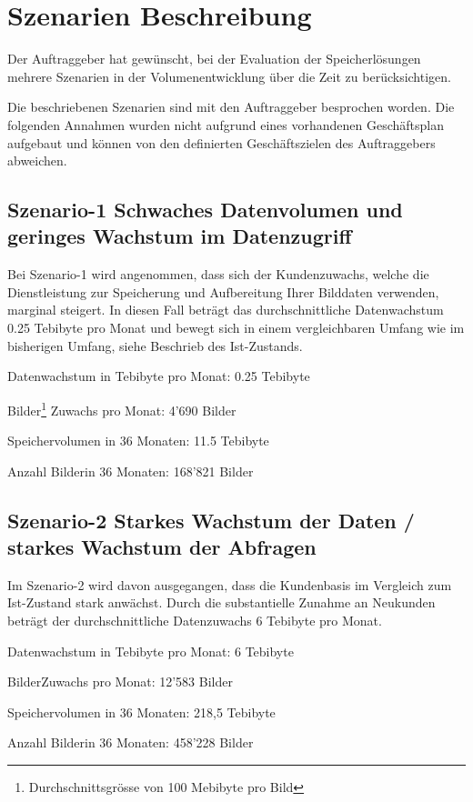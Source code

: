 
\cleardoublepage
\chapter{Szenarien Beschreibung}
Der Auftraggeber hat gewünscht, bei der Evaluation der Speicherlösungen mehrere Szenarien in der Volumenentwicklung über die Zeit zu berücksichtigen. 

Die beschriebenen Szenarien sind mit den Auftraggeber besprochen worden. Die folgenden Annahmen wurden nicht aufgrund eines vorhandenen Geschäftsplan aufgebaut und können von den definierten Geschäftszielen des Auftraggebers abweichen. 


\section{Szenario-1 Schwaches Datenvolumen und geringes Wachstum im Datenzugriff}\label{Szenario-1}
Bei Szenario-1 wird angenommen, dass sich der Kundenzuwachs, welche die Dienstleistung zur Speicherung und Aufbereitung Ihrer Bilddaten verwenden, marginal steigert. In diesen Fall beträgt das durchschnittliche Datenwachstum 0.25 Tebibyte pro Monat und bewegt sich in einem vergleichbaren Umfang wie im bisherigen Umfang, siehe Beschrieb des Ist-Zustands.


Datenwachstum in Tebibyte pro Monat: 0.25 Tebibyte

Bilder\footnote{Durchschnittsgrösse von 100 Mebibyte pro Bild} Zuwachs pro Monat: 4'690 Bilder

Speichervolumen in 36 Monaten: 11.5 Tebibyte

Anzahl Bilder\footnotemark[\value{footnote}] in 36 Monaten: 168'821 Bilder

\section{Szenario-2 Starkes Wachstum der Daten / starkes Wachstum der Abfragen}
\label{Szenario-2}
Im Szenario-2 wird davon ausgegangen, dass die Kundenbasis im Vergleich zum Ist-Zustand stark anwächst. Durch die substantielle Zunahme an Neukunden beträgt der durchschnittliche Datenzuwachs 6 Tebibyte pro Monat.


Datenwachstum in Tebibyte pro Monat: 6 Tebibyte

Bilder\footnotemark[\value{footnote}] Zuwachs pro Monat: 12'583 Bilder

Speichervolumen in 36 Monaten: 218,5 Tebibyte

Anzahl Bilder\footnotemark[\value{footnote}] in 36 Monaten: 458'228 Bilder
 
